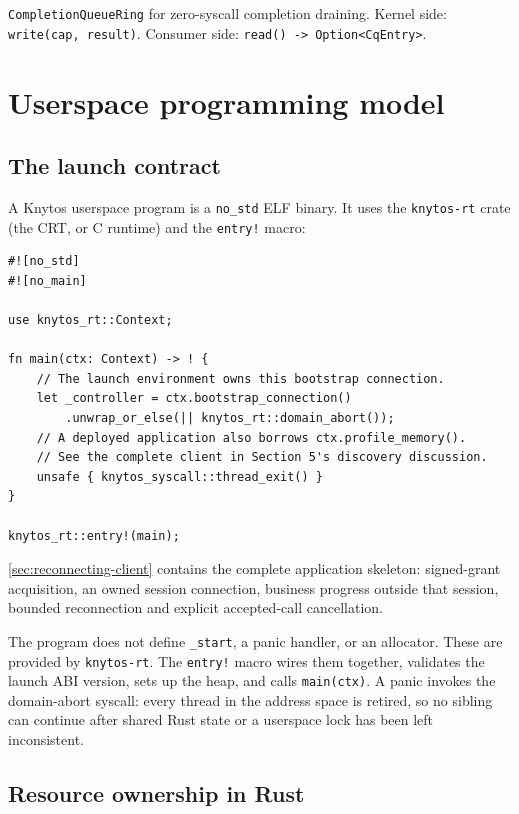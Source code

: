 \texttt{CompletionQueueRing} for zero-syscall completion draining.
Kernel side: \texttt{write(cap, result)}. Consumer side:
\texttt{read() -> Option<CqEntry>}.

\section{Userspace programming model}

\subsection{The launch contract}

A Knytos userspace program is a \texttt{no\_std} ELF binary. It uses
the \texttt{knytos-rt} crate (the CRT, or C runtime) and the \texttt{entry!}
macro:

\begin{lstlisting}[style=rustCode]
#![no_std]
#![no_main]

use knytos_rt::Context;

fn main(ctx: Context) -> ! {
    // The launch environment owns this bootstrap connection.
    let _controller = ctx.bootstrap_connection()
        .unwrap_or_else(|| knytos_rt::domain_abort());
    // A deployed application also borrows ctx.profile_memory().
    // See the complete client in Section 5's discovery discussion.
    unsafe { knytos_syscall::thread_exit() }
}

knytos_rt::entry!(main);
\end{lstlisting}

\autoref{sec:reconnecting-client} contains the complete application skeleton:
signed-grant acquisition, an owned session connection, business progress outside
that session, bounded reconnection and explicit accepted-call cancellation.

The program does not define \texttt{\_start}, a panic handler, or an allocator.
These are provided by \texttt{knytos-rt}. The \texttt{entry!} macro wires them
together, validates the launch ABI version, sets up the heap, and calls
\texttt{main(ctx)}. A panic invokes the domain-abort syscall: every thread in
the address space is retired, so no sibling can continue after shared Rust
state or a userspace lock has been left inconsistent.

\subsection{Resource ownership in Rust}

